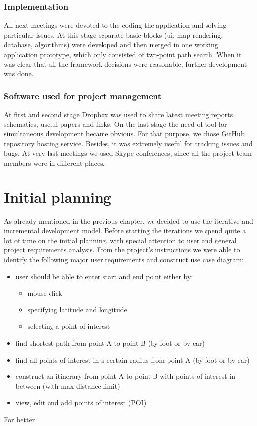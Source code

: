 \documentclass[reqno,openany,12pt]{amsbook}
\theoremstyle{definition}
\theoremstyle{remark}
\begin{document}
\subsection{Implementation}
All next meetings were devoted to the coding the application and solving particular issues. At this stage separate basic blocks (ui, map-rendering, database, algorithms) were developed and then merged in one working application prototype, which only consisted of two-point path search. When it was clear that all the framework decisions were reasonable, further development was done.

\subsection{Software used for project management}
At first and second stage Dropbox was used to share latest meeting reports, schematics, useful papers and links. On the last stage the need of tool for simultaneous development became obvious. For that purpose, we chose GitHub repository hosting service. Besides, it was extremely useful for tracking issues and bugs. At very last meetings we used Skype conferences, since all the project team members were in different places.

\chapter{Initial planning}
As already mentioned in the previous chapter, we decided to use the iterative and incremental development model. Before starting the iterations we spend quite a lot of time on the initial planning, with special attention to user and general project requirements analysis. From the project's instructions we were able to identify the following major user requirements and construct use case diagram:
\begin{itemize}
\item user should be able to enter start and end point either by:
\begin{itemize}
\item mouse click
\item specifying latitude and longitude
\item selecting a point of interest
\end{itemize}
\item find shortest path from point A to point B (by foot or by car)
\item find all points of interest in a certain radius from point A (by foot or by car)
\item construct an itinerary from point A to point B with points of interest in between (with max distance limit)
\item view, edit and add points of interest (POI)
\end{itemize}
For better 
\end{document}
